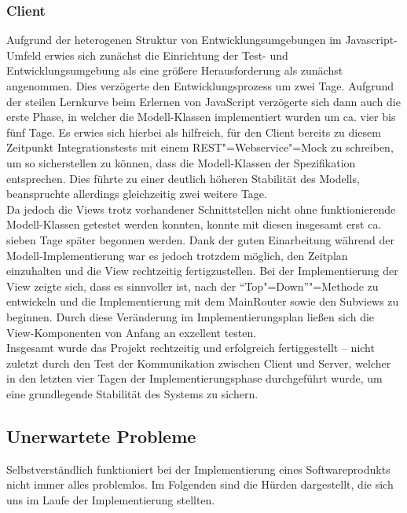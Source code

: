  \subsubsection{Client}
 Aufgrund der heterogenen Struktur von Entwicklungsumgebungen im Javascript-Umfeld erwies sich zunächst die Einrichtung der Test- und Entwicklungsumgebung als eine größere Herausforderung als zunächst angenommen. Dies verzögerte den Entwicklungsprozess um zwei Tage. 
 Aufgrund der steilen Lernkurve beim Erlernen von JavaScript verzögerte sich dann auch die erste Phase, in welcher die Modell-Klassen implementiert wurden um ca. vier bis fünf Tage. Es erwies sich hierbei als hilfreich, für den Client bereits zu diesem Zeitpunkt Integrationstests mit einem REST"=Webservice"=Mock zu schreiben, um so sicherstellen zu können, dass die Modell-Klassen der Spezifikation entsprechen. Dies führte zu einer deutlich höheren Stabilität des Modells, beanspruchte allerdings gleichzeitig zwei weitere Tage.\\
 Da jedoch die Views trotz vorhandener Schnittstellen nicht ohne funktionierende Modell-Klassen getestet werden konnten, konnte mit diesen  insgesamt erst ca. sieben Tage später begonnen werden. Dank der guten Einarbeitung während der Modell-Implementierung war es jedoch trotzdem möglich, den Zeitplan einzuhalten und die View rechtzeitig fertigzustellen. Bei der Implementierung der View zeigte sich, dass es sinnvoller ist, nach der \enquote{Top"=Down}"=Methode zu entwickeln und die Implementierung mit dem MainRouter sowie den Subviews zu beginnen. Durch diese Veränderung im Implementierungsplan ließen sich die View-Komponenten von Anfang an exzellent testen.\\
 Insgesamt wurde das Projekt rechtzeitig und erfolgreich fertiggestellt -- nicht zuletzt durch den Test der Kommunikation zwischen Client und Server, welcher in den letzten vier Tagen der Implementierungsphase durchgeführt wurde, um eine grundlegende Stabilität des Systems zu sichern.
 
 
 
 \subsection{Unerwartete Probleme}
 \label{subsec:problems}
 Selbstverständlich funktioniert bei der Implementierung eines Softwareprodukts nicht immer alles problemlos. Im Folgenden sind die Hürden dargestellt, die sich uns im Laufe der Implementierung stellten.
 
